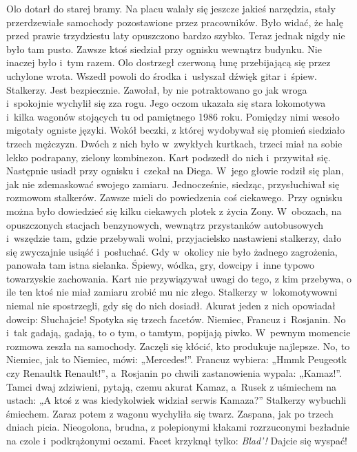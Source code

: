 \documentclass[../MAIN.tex]{subfiles}
\begin{document}
\pp
Olo dotarł do starej bramy. Na placu walały się jeszcze jakieś narzędzia, stały przerdzewiałe samochody pozostawione przez pracowników. Było widać, że halę przed prawie trzydziestu laty opuszczono bardzo szybko. Teraz jednak nigdy nie było tam pusto. Zawsze ktoś siedział przy ognisku wewnątrz budynku. Nie inaczej było i~tym razem. Olo dostrzegł czerwoną łunę przebijającą się przez uchylone wrota. Wszedł powoli do środka i~usłyszał dźwięk gitar i~śpiew. Stalkerzy. Jest bezpiecznie. Zawołał, by nie potraktowano go jak wroga i~spokojnie wychylił się zza rogu. Jego oczom ukazała się stara lokomotywa i~kilka wagonów stojących tu od pamiętnego 1986 roku. Pomiędzy nimi wesoło migotały ogniste języki. Wokół beczki, z której wydobywał się płomień siedziało trzech mężczyzn. Dwóch z nich było w~zwykłych kurtkach, trzeci miał na sobie lekko podrapany, zielony kombinezon. Kart podszedł do nich i~przywitał się. Następnie usiadł przy ognisku i~czekał na Diega. W~jego głowie rodził się plan, jak nie zdemaskować swojego
zamiaru. Jednocześnie, siedząc, przysłuchiwał się rozmowom stalkerów.
\pp
Zawsze mieli do powiedzenia coś ciekawego. Przy ognisku można było dowiedzieć się kilku ciekawych plotek z życia Zony. W~obozach, na opuszczonych stacjach benzynowych, wewnątrz przystanków autobusowych i~wszędzie tam, gdzie przebywali wolni, przyjacielsko nastawieni stalkerzy, dało się zwyczajnie usiąść i~posłuchać. Gdy w~okolicy nie było żadnego zagrożenia, panowała tam istna sielanka. Śpiewy, wódka, gry, dowcipy i~inne typowo towarzyskie zachowania. Kart nie przywiązywał uwagi do tego, z kim przebywa, o ile ten ktoś nie miał zamiaru zrobić mu nic złego. Stalkerzy w~lokomotywowni niemal nie spostrzegli, gdy się do nich dosiadł. Akurat jeden z nich opowiadał dowcip:
\sx Słuchajcie! Spotyka się trzech facetów. Niemiec, Francuz i~Rosjanin. No i~tak gadają, gadają, to o tym, o tamtym, popijają piwko. W~pewnym momencie rozmowa zeszła na samochody. Zaczęli się kłócić, kto produkuje najlepsze. No, to Niemiec, jak to Niemiec, mówi: „Mercedes!”. Francuz wybiera: „Hmm\3k Peugeot\3k czy Renault\3k Renault!”, a~Rosjanin po chwili zastanowienia wypala: „Kamaz!”. Tamci dwaj zdziwieni, pytają, czemu akurat Kamaz, a~Rusek z uśmiechem na ustach: „A ktoś z was kiedykolwiek widział serwis Kamaza?”
\qd
\hspace{20.4em}Stalkerzy wybuchli śmiechem. Zaraz potem z wagonu wychyliła się twarz. Zaspana, jak po trzech dniach picia. Nieogolona, brudna, z polepionymi kłakami rozrzuconymi bezładnie na czole i~podkrążonymi oczami. Facet krzyknął tylko:
\sx  \textit{Blad'!} Dajcie się wyspać!
\end{document}
